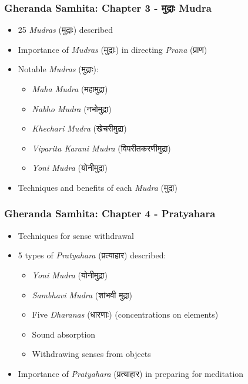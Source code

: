 \begin{frame}[fragile]\frametitle{Gheranda Samhita: Chapter 3 - मुद्राः Mudra}
\begin{itemize}
    \item 25 \textit{Mudras} (मुद्राः) described
    \item Importance of \textit{Mudras} (मुद्राः) in directing \textit{Prana} (प्राण)
    \item Notable \textit{Mudras} (मुद्राः):
    \begin{itemize}
        \item \textit{Maha Mudra} (महामुद्रा)
        \item \textit{Nabho Mudra} (नभोमुद्रा)
        \item \textit{Khechari Mudra} (खेचरीमुद्रा)
        \item \textit{Viparita Karani Mudra} (विपरीतकरणीमुद्रा)
        \item \textit{Yoni Mudra} (योनीमुद्रा)
    \end{itemize}
    \item Techniques and benefits of each \textit{Mudra} (मुद्रा)
\end{itemize}
\end{frame}

\begin{frame}[fragile]\frametitle{Gheranda Samhita: Chapter 4 - Pratyahara}
\begin{itemize}
    \item Techniques for sense withdrawal
    \item 5 types of \textit{Pratyahara} (प्रत्याहार) described:
    \begin{itemize}
        \item \textit{Yoni Mudra} (योनीमुद्रा)
        \item \textit{Sambhavi Mudra} (शांभवी मुद्रा)
        \item Five \textit{Dharanas} (धारणाः) (concentrations on elements)
        \item Sound absorption
        \item Withdrawing senses from objects
    \end{itemize}
    \item Importance of \textit{Pratyahara} (प्रत्याहार) in preparing for meditation
\end{itemize}
\end{frame}



